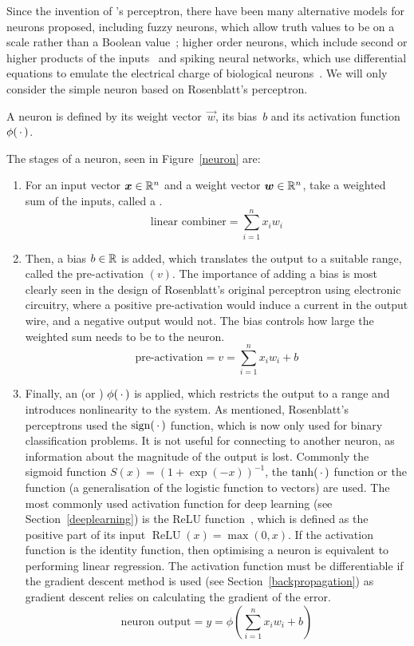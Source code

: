 Since the invention of \citeauthor{rosenblatt1957}'s perceptron, there have been many alternative models for neurons proposed, including fuzzy neurons, which allow truth values to be on a scale rather than a Boolean value~\autocite{gupta1991}; higher order neurons, which include second or higher products of the inputs~\autocite{rumelhart1986} and spiking neural networks, which use differential equations to emulate the electrical charge of biological neurons~\autocite{maass1997}.
We will only consider the simple neuron based on Rosenblatt's perceptron.

A neuron is defined by its weight vector~\(\vec{w}\), its bias~\(b\) and its activation function~\(\phi(\,\cdot\,)\).

The stages of a neuron, seen in Figure~\ref{neuron} are:
\begin{enumerate}
 \item For an input vector \(\bm{x} \in \mathbb{R}^n\) and a weight vector \(\bm{w} \in \mathbb{R}^n\), take a weighted sum of the inputs, called a .
       \[ \text{linear combiner} = \sum_{i=1}^{n}{x_i w_i} \]
 \item Then, a bias \(b \in \mathbb{R}{}\) is added, which translates the output to a suitable range, called the pre-activation \((v)\).
       The importance of adding a bias is most clearly seen in the design of Rosenblatt's original perceptron using electronic circuitry, where a positive pre-activation would induce a current in the output wire, and a negative output would not.
       The bias controls how large the weighted sum needs to be to  the neuron.
       \[ \text{pre-activation} = v = \sum_{i=1}^{n}{x_i w_i} + b \]
 \item Finally, an  (or ) \(\phi(\,\cdot\,)\) is applied, which restricts the output to a range and introduces nonlinearity to the system.
       As mentioned, Rosenblatt's perceptrons used the \(\operatorname{sign}(\,\cdot\,)\) function, which is now only used for binary classification problems.
       It is not useful for connecting to another neuron, as information about the magnitude of the output is lost.
       Commonly the sigmoid function \(S(x) = (1+\exp(-x))^{-1}\), the \(\tanh(\,\cdot\,)\) function or the  function (a generalisation of the logistic function to vectors) are used.
       The most commonly used activation function for deep learning (see Section~\ref{deeplearning}) is the \ac{ReLU} function~\autocite{ramachandran2017}, which is defined as the positive part of its input \(\operatorname{ReLU}(x) = \max(0, x)\).
       If the activation function is the identity function, then optimising a neuron is equivalent to performing linear regression.
       The activation function must be differentiable if the gradient descent method is used (see Section~\ref{backpropagation}) as gradient descent relies on calculating the gradient of the error.
       \[ \text{neuron output} = y = \phi\left(\sum_{i=1}^{n}{x_i w_i} + b \right) \]
\end{enumerate}

